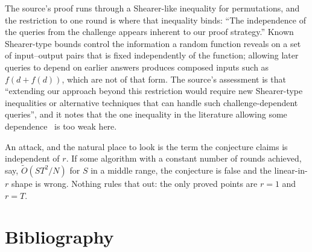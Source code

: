 \documentclass{aicr-conjecture}
\newcommand{\Ot}{\widetilde{O}}
\begin{document}
\begin{remark}
The source's proof runs through a Shearer-like inequality for
permutations, and the restriction to one round is where that inequality
binds: ``The independence of the queries from the challenge appears
inherent to our proof strategy.'' Known Shearer-type bounds control the
information a random function reveals on a set of input--output pairs
that is fixed independently of the function; allowing later queries to
depend on earlier answers produces composed inputs such as
$f(d + f(d))$, which are not of that form. The source's assessment is
that ``extending our approach beyond this restriction would require new
Shearer-type inequalities or alternative techniques that can handle
such challenge-dependent queries'', and it notes that the one
inequality in the literature allowing some dependence~\cite{RS18} is
too weak here.
\end{remark}

\begin{remark}
An attack, and the natural place to look is the term the conjecture
claims is independent of $r$. If some algorithm with a constant number
of rounds achieved, say, $\Ot(S T^{2}/N)$ for $S$ in a middle range,
the conjecture is false and the linear-in-$r$ shape is wrong. Nothing
rules that out: the only proved points are $r = 1$ and $r = T$.
\end{remark}

\section{Bibliography}
\end{document}
